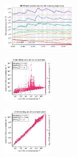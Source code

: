 \begin{figure}[H]
    \begin{subfigure}
    \centering
    \includegraphics[width=0.4\textwidth]{prediction/figures/models/mlpmodel-training-prediction.pdf}
    \end{subfigure}
    \begin{subfigure}
    \centering
    \includegraphics[width=0.275\textwidth]{prediction/figures/models/mlpmodel-test-generalisation.pdf}
    \end{subfigure}
    \begin{subfigure}
    \centering
    \includegraphics[width=0.275\textwidth]{prediction/figures/models/mlpmodel-test-prediction.pdf}
    \end{subfigure}


\end{figure}
